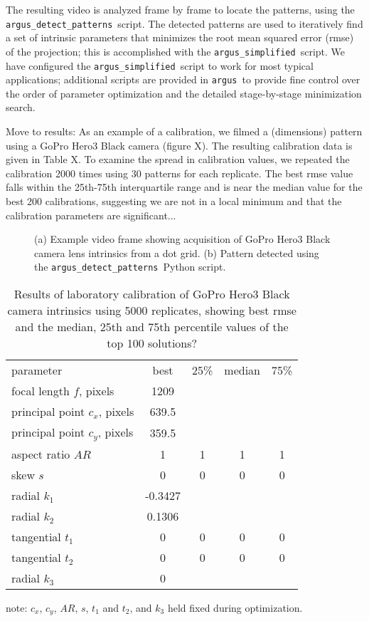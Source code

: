 \documentclass[fleqn,10pt]{wlpeerj}
\newcommand{\argus}{\texttt{argus}}
\newcommand{\detectpatterns}{\texttt{argus\_detect\_patterns}}
\newcommand{\simplified}{\texttt{argus\_simplified}}
\begin{document}
{The resulting video is analyzed frame by frame to locate the patterns, using the \detectpatterns\ script.  The detected patterns are used to iteratively find a set of intrinsic parameters that minimizes the root mean squared error (rmse) of the projection; this is accomplished with the \simplified\ script.  We have configured the \simplified\ script to work for most typical applications; additional scripts are provided in \argus\ to provide fine control over the order of parameter optimization and the detailed stage-by-stage minimization search.

Move to results: As an example of a calibration, we filmed a (dimensions) pattern using a GoPro Hero3 Black camera (figure X).  The resulting calibration data is given in Table X. To examine the spread in calibration values, we repeated the calibration 2000 times using 30 patterns for each replicate. The best rmse value falls within the 25th-75th interquartile range and is near the median value for the best 200 calibrations, suggesting we are not in a local minimum and that the calibration parameters are significant...   

\begin{figure}
\caption{(a) Example video frame showing acquisition of GoPro Hero3 Black camera lens intrinsics from a dot grid.  (b) Pattern detected using the \detectpatterns\ Python script.}
\label{fig:labcal1}
\end{figure}

\begin{table}
\caption{Results of laboratory calibration of GoPro Hero3 Black camera intrinsics using 5000 replicates, showing best rmse and the median, 25th and 75th percentile values of the top 100 solutions? }
\label{tab:labcal2}
\begin{center}
\begin{tabular}{lcccc}
parameter & best & 25\% & median & 75\% \\
\cline{1-5}
focal length $f$, pixels & 1209 & & &\\
principal point $c_x$, pixels & 639.5 & & & \\
principal point $c_y$, pixels & 359.5 & & & \\
aspect ratio $AR$ & 1 & 1 & 1 & 1\\
skew $s$ & 0 & 0 & 0 & 0 \\
radial $k_1$ & -0.3427 & & & \\
radial $k_2$ & 0.1306 & & & \\
tangential $t_1$ & 0 & 0 & 0 & 0 \\
tangential $t_2$ & 0 & 0 & 0 & 0 \\
radial $k_3$ & 0 & & & \\
\end{tabular}
\end{center}
note: $c_x$, $c_y$, $AR$, $s$, $t_1$ and $t_2$, and $k_3$ held fixed during optimization.
\end{table}

}
\end{document}

